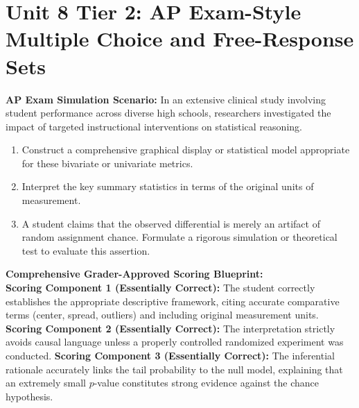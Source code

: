 \section{Unit 8 Tier 2: AP Exam-Style Multiple Choice and Free-Response Sets}
\begin{workbookbox}
\textbf{AP Exam Simulation Scenario:} In an extensive clinical study involving student performance across diverse high schools, researchers investigated the impact of targeted instructional interventions on statistical reasoning.
\begin{enumerate}[label=(\alph*)]
  \item Construct a comprehensive graphical display or statistical model appropriate for these bivariate or univariate metrics.
  \item Interpret the key summary statistics in terms of the original units of measurement.
  \item A student claims that the observed differential is merely an artifact of random assignment chance. Formulate a rigorous simulation or theoretical test to evaluate this assertion.
\end{enumerate}
\textbf{Comprehensive Grader-Approved Scoring Blueprint:}\\
\textbf{Scoring Component 1 (Essentially Correct):} The student correctly establishes the appropriate descriptive framework, citing accurate comparative terms (center, spread, outliers) and including original measurement units.
\textbf{Scoring Component 2 (Essentially Correct):} The interpretation strictly avoids causal language unless a properly controlled randomized experiment was conducted.
\textbf{Scoring Component 3 (Essentially Correct):} The inferential rationale accurately links the tail probability to the null model, explaining that an extremely small $p$-value constitutes strong evidence against the chance hypothesis.
\end{workbookbox}\vspace{6pt}
